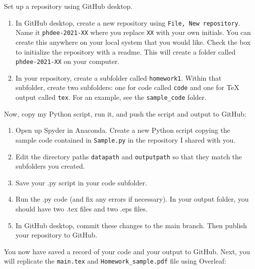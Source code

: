 \documentclass{article}
\begin{document}
Set up a repository using GitHub desktop.
\begin{enumerate}
    \item In GitHub desktop, create a new repository using \verb!File, New repository!.  Name it \verb!phdee-2021-XX! where you replace \verb!XX! with your own initials. You can create this anywhere on your local system that you would like. Check the box to initialize the repository with a readme.  This will create a folder called \verb!phdee-2021-XX! on your computer.
    \item In your repository, create a subfolder called \verb!homework1!.  Within that subfolder, create two subfolders: one for code called \verb!code! and one for TeX output called \verb!tex!.  For an example, see the \verb!sample_code! folder.
\end{enumerate}
Now, copy my Python script, run it, and push the script and output to GitHub:
\begin{enumerate}
    \item Open up Spyder in Anaconda.  Create a new Python script copying the sample code contained in \verb!Sample.py! in the repository I shared with you.
    \item Edit the directory paths \verb!datapath! and \verb!outputpath! so that they match the subfolders you created.
    \item Save your .py script in your code subfolder.
    \item Run the .py code (and fix any errors if necessary).  In your output folder, you should have two .tex files and two .eps files.
    \item In GitHub desktop, commit these changes to the main branch.  Then publish your repository to GitHub.
\end{enumerate}
You now have saved a record of your code and your output to GitHub.  Next, you will replicate the \verb!main.tex! and \verb!Homework_sample.pdf! file using Overleaf:
\end{document}
